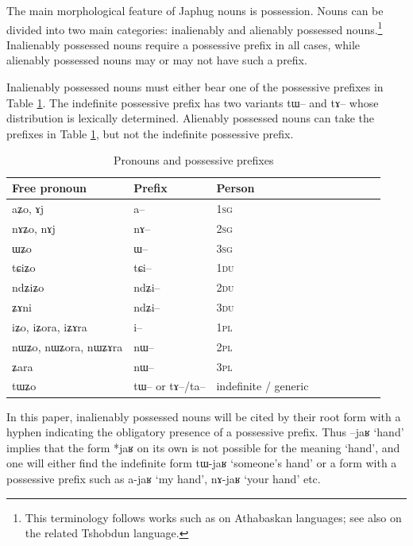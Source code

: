 \documentclass[oldfontcommands,oneside,a4paper,11pt]{article}
\newcommand{\ipa}[1]{{\phon \mbox{#1}}} %
\newcommand{\du}{\textsc{du}}
\newcommand{\pl}{\textsc{pl}}
\newcommand{\sg}{\textsc{sg}}
\begin{document}
The main morphological feature of Japhug nouns is possession. Nouns can be divided into two main categories: inalienably and alienably possessed nouns.\footnote{This terminology follows works such as \citet{thompson96koyukon}  on Athabaskan languages; see also \citet{jackson98morphology} on the related Tshobdun language.} Inalienably possessed nouns require a possessive prefix in all cases, while alienably possessed nouns may or may not have such a prefix.

Inalienably possessed nouns must either bear one of the possessive prefixes in Table \ref{tab:pronoun}. The indefinite possessive prefix has two variants \ipa{tɯ}-- and \ipa{tɤ}-- whose distribution  is lexically determined. Alienably possessed nouns can take the prefixes in Table \ref{tab:pronoun}, but not the indefinite possessive prefix. 



\begin{table}[H] \centering
\caption{Pronouns and possessive prefixes }\label{tab:pronoun}
\begin{tabular}{lllllllll} 
\toprule
 Free pronoun & Prefix & Person\\
\midrule
 \ipa{aʑo},    \ipa{ɤj} &	\ipa{a--}  &		1\sg{} \\
\ipa{nɤʑo},  \ipa{nɤj} &	\ipa{nɤ--}  &			2\sg{} \\
\ipa{ɯʑo}  &	\ipa{ɯ--}  &			3\sg{} \\
\ipa{tɕiʑo}  &	\ipa{tɕi--}  &			1\du{} \\
\ipa{ndʑiʑo}  &	\ipa{ndʑi--}  &		2\du{} \\	
\ipa{ʑɤni}  &	\ipa{ndʑi--}  &		3\du{} \\	
\ipa{iʑo}, \ipa{iʑora},   \ipa{iʑɤra}   &	\ipa{i--}  &			1\pl{} \\
\ipa{nɯʑo}, \ipa{nɯʑora},   \ipa{nɯʑɤra}  &	\ipa{nɯ--}  &			2\pl{} \\
\ipa{ʑara}  &	\ipa{nɯ--}  &			3\pl{} \\
\ipa{tɯʑo} & \ipa{tɯ--} or \ipa{tɤ--}/\ipa{ta--} & indefinite / generic\\
\bottomrule
\end{tabular}
\end{table}
In this paper, inalienably possessed nouns will be cited by their root form with a hyphen indicating the obligatory presence of a possessive prefix. Thus \ipa{--jaʁ} `hand' implies that the form *\ipa{jaʁ} on its own is not possible for the meaning `hand', and one will either find the indefinite form \ipa{tɯ-jaʁ} `someone's hand' or a form with a possessive prefix such as \ipa{a-jaʁ} `my hand', \ipa{nɤ-jaʁ} `your hand' etc.
\end{document}
